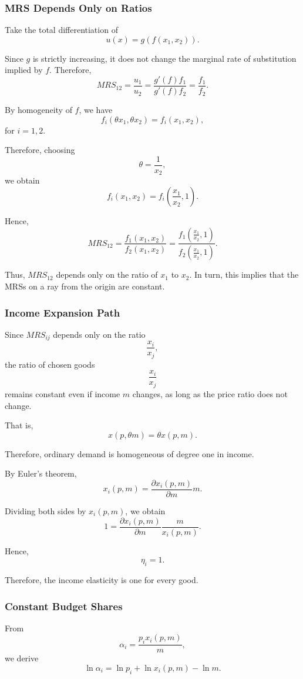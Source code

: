 \subsubsection{MRS Depends Only on Ratios}

Take the total differentiation of
\[
u(x)=g(f(x_1,x_2)).
\]

Since \(g\) is strictly increasing, it does not change the marginal rate of substitution implied by \(f\). Therefore,
\[
MRS_{12}
=
\frac{u_1}{u_2}
=
\frac{g'(f)f_1}{g'(f)f_2}
=
\frac{f_1}{f_2}.
\]

By homogeneity of \(f\), we have
\[
f_i(\theta x_1,\theta x_2)=f_i(x_1,x_2),
\]
for \(i=1,2\).

Therefore, choosing
\[
\theta=\frac{1}{x_2},
\]
we obtain
\[
f_i(x_1,x_2)
=
f_i\left(\frac{x_1}{x_2},1\right).
\]

Hence,
\[
MRS_{12}
=
\frac{f_1(x_1,x_2)}{f_2(x_1,x_2)}
=
\frac{
f_1\left(\frac{x_1}{x_2},1\right)
}{
f_2\left(\frac{x_1}{x_2},1\right)
}.
\]

Thus, \(MRS_{12}\) depends only on the ratio of \(x_1\) to \(x_2\). In turn, this implies that the MRSs on a ray from the origin are constant.

\subsubsection{Income Expansion Path}

Since \(MRS_{ij}\) depends only on the ratio
\[
\frac{x_i}{x_j},
\]
the ratio of chosen goods
\[
\frac{x_i}{x_j}
\]
remains constant even if income \(m\) changes, as long as the price ratio does not change.

That is,
\[
x(p,\theta m)=\theta x(p,m).
\]

Therefore, ordinary demand is homogeneous of degree one in income.

By Euler's theorem,
\[
x_i(p,m)
=
\frac{\partial x_i(p,m)}{\partial m}m.
\]

Dividing both sides by \(x_i(p,m)\), we obtain
\[
1
=
\frac{\partial x_i(p,m)}{\partial m}
\frac{m}{x_i(p,m)}.
\]

Hence,
\[
\eta_i=1.
\]

Therefore, the income elasticity is one for every good.

\subsubsection{Constant Budget Shares}

From
\[
\alpha_i
=
\frac{p_i x_i(p,m)}{m},
\]
we derive
\[
\ln \alpha_i
=
\ln p_i
+
\ln x_i(p,m)
-
\ln m.
\]

